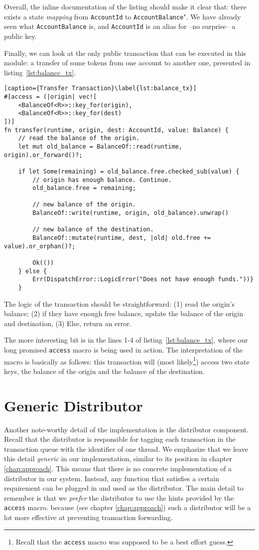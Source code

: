 Overall, the inline documentation of the listing should make it clear that: there exists a state
\textit{mapping} from \texttt{AccountId} to \texttt{AccountBalance}". We have already seen what
\texttt{AccountBalance} is, and \texttt{AccountId} is an alias for --no surprise-- a public key.

Finally, we can look at the only public transaction that can be executed in this module: a transfer
of some tokens from one account to another one, presented in listing~\ref{lst:balance_tx}.

\begin{lstlisting}[caption={Transfer Transaction}\label{lst:balance_tx}]
#[access = (|origin| vec![
	<BalanceOf<R>>::key_for(origin),
	<BalanceOf<R>>::key_for(dest)
])]
fn transfer(runtime, origin, dest: AccountId, value: Balance) {
	// read the balance of the origin.
	let mut old_balance = BalanceOf::read(runtime, origin).or_forward()?;

	if let Some(remaining) = old_balance.free.checked_sub(value) {
		// origin has enough balance. Continue.
		old_balance.free = remaining;

		// new balance of the origin.
		BalanceOf::write(runtime, origin, old_balance).unwrap()

		// new balance of the destination.
		BalanceOf::mutate(runtime, dest, |old| old.free += value).or_orphan()?;

		Ok(())
	} else {
		Err(DispatchError::LogicError("Does not have enough funds."))}
	}
\end{lstlisting}

The logic of the transaction should be straightforward: (1) read the origin's balance; (2) if they have
enough free balance, update the balance of the origin and destination, (3) Else, return an error.

The more interesting bit is in the lines 1-4 of listing~\ref{lst:balance_tx}, where our long promised \texttt{access} macro is being
used in action. The interpretation of the macro is basically as follows: this transaction will (most
likely\footnote{Recall that the \texttt{access} macro was supposed to be a best effort guess.})
access two state keys, the balance of the origin and the balance of the destination.

\section{Generic Distributor}

Another note-worthy detail of the implementation is the distributor component. Recall that the
distributor is responsible for tagging each transaction in the transaction queue with the identifier
of one thread. We emphasize that we leave this detail \textit{generic} in our implementation, similar
to its position in chapter \ref{chap:approach}. This means that there is no concrete implementation
of a distributor in our system. Instead, any function that satisfies a certain requirement can be
plugged in and used as the distributor. The main detail to remember is that we \textit{prefer} the
distributor to use the hints provided by the \texttt{access} macro. because (see
chapter \ref{chap:approach}) such a distributor will be a lot more effective at preventing
transaction forwarding.

